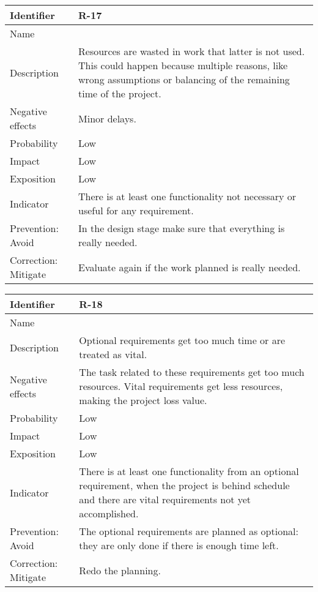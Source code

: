\begin{table}[H]
	\begin{tabularx}{\textwidth}{|y|z|}
		\hline
		Identifier & \textbf{R-17} \\ \hline
		Name & \Rdiecisiete \\ \hline
		Description &
			Resources are wasted in work that latter is not used. \linej
			This could happen because multiple reasons, like wrong assumptions or balancing of the remaining time of the project.
		\\ \hline
		Negative effects &
			Minor delays.
		\\ \hline
		Probability & Low\\ \hline
		Impact &  Low\\ \hline
		Exposition &  Low\\ \hline
		Indicator & There is at least one functionality not necessary or useful for any requirement.\\ \hline
		Prevention: Avoid &
			In the design stage make sure that everything is really needed.
		\\ \hline
		Correction: Mitigate &
			Evaluate again if the work planned is really needed.
		\\ \hline
	\end{tabularx}
\end{table}

\begin{table}[H]
	\begin{tabularx}{\textwidth}{|y|z|}
		\hline
		Identifier & \textbf{R-18} \\ \hline
		Name & \Rdieciocho \\ \hline
		Description &
			Optional requirements get too much time or are treated as vital.
		\\ \hline
		Negative effects &
			The task related to these requirements get too much resources.\linej
			Vital requirements get less resources, making the project loss value.
		\\ \hline
		Probability & Low\\ \hline
		Impact &  Low\\ \hline
		Exposition &  Low\\ \hline
		Indicator & There is at least one functionality from an optional requirement, when the project is behind schedule and there are vital requirements not yet accomplished.\\ \hline
		Prevention: Avoid &
			The optional requirements are planned as optional: they are only done if there is enough time left.
		\\ \hline
		Correction: Mitigate &
			Redo the planning.
		\\ \hline
	\end{tabularx}
\end{table}

